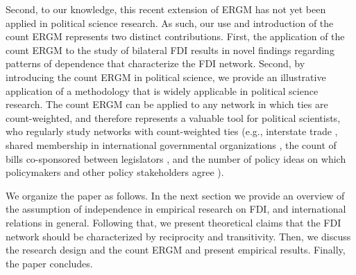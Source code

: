 \documentclass[reqno,onecolumn,letterpaper,12pt]{article}
\begin{document}
Second, %
to our knowledge, this recent extension of ERGM has not yet been applied in political science research. As such, our use and introduction of the count ERGM represents two distinct contributions. First, the application of the count ERGM to the study of bilateral FDI results in novel findings regarding patterns of dependence that characterize the FDI network. Second, by introducing the count ERGM in political science, we provide an illustrative application of a methodology that is widely applicable in political science research. The count ERGM can be applied to any network in which ties are count-weighted, and therefore represents a valuable tool for political scientists, who regularly study networks with count-weighted ties (e.g., interstate trade \citep{ward2007persistent}, shared membership in international governmental organizations \citep{boehmke2016addressing}, the count of bills co-sponsored between legislators \citep{kirkland2013hypothesis}, and the number of policy ideas on which policymakers and other policy stakeholders agree \citep{leifeld2013reconceptualizing}).





We organize the paper as follows. In the next section we provide an overview of the assumption of independence in empirical research on FDI, and international relations in general. Following that, we present theoretical claims that the FDI network should be characterized by reciprocity and transitivity. Then, we discuss the research design and the count ERGM and present empirical results. Finally, the paper concludes.
\end{document}
